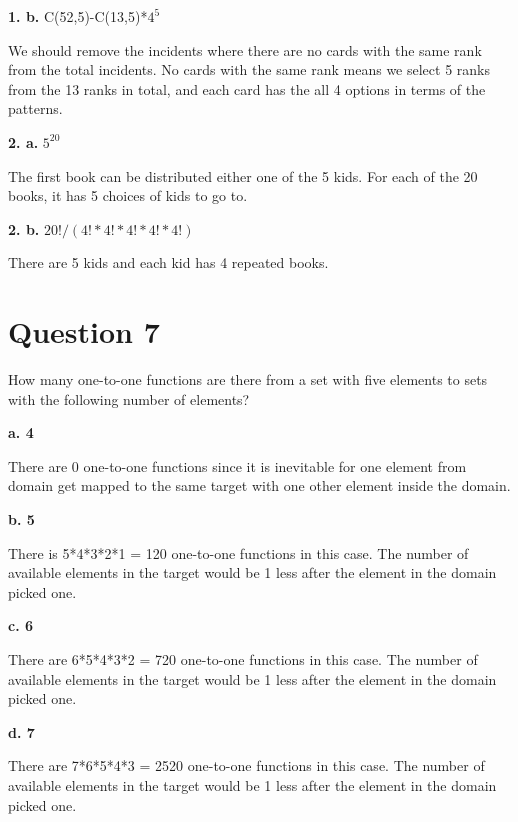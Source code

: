 \documentclass[11pt]{article}
\begin{document}
	\vspace{10mm}
	\textbf{1. b.}
	C(52,5)-C(13,5)*$4^5$
	
	We should remove the incidents where there are no cards with the same rank from the total incidents. No cards with the same rank means we select 5 ranks from the 13 ranks in total, and each card has the all 4 options in terms of the patterns.
	
	\vspace{10mm}
	\textbf{2. a.}
	$5^{20}$
	
	The first book can be distributed either one of the 5 kids. For each of the 20 books, it has 5 choices of kids to go to. 
	
	\vspace{10mm}
	\textbf{2. b.}
	$20!/(4!*4!*4!*4!*4!)$
	
	There are 5 kids and each kid has 4 repeated books.
	
	\newpage
	\section*{Question 7}
	How many one-to-one functions are there from a set with five elements to sets with the following number of elements?
	
	\textbf{a. 4}
	
	There are 0 one-to-one functions since it is inevitable for one element from domain get mapped to the same target with one other element inside the domain.
	
	\textbf{b. 5}
	
	There is 5*4*3*2*1 = 120 one-to-one functions in this case. The number of available elements in the target would be 1 less after the element in the domain picked one.
	
	\textbf{c. 6}
	
	There are 6*5*4*3*2 = 720 one-to-one functions in this case. The number of available elements in the target would be 1 less after the element in the domain picked one.
	
	\textbf{d. 7}
	
	There are 7*6*5*4*3 = 2520 one-to-one functions in this case. The number of available elements in the target would be 1 less after the element in the domain picked one.
	
\end{document}
